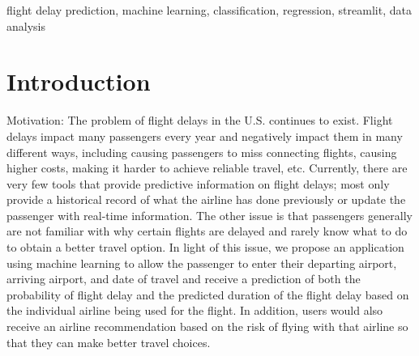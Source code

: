 
\begin{abstract}

Flight delays are a common issue that affect both airline operations and passengers. The purpose of this work is to investigate the delay of airline flights by analyzing historical airline flight data, using two types of machine learning techniques, classification (to predict if the flight will be delayed) and regression (to estimate the delay time). The training datasets used for both types of models are publicly accessible. Model comparison metrics used include accuracy, precision, recall, and mean square error.  

In addition to model performance being important, this work will demonstrate the practicality of these types of models by providing an interactive interface (with Streamlit) to allow users to enter their own flight information into the system to receive real-time predictions and visual insights. Multi-variable models are expected to outperform their simple baseline counterparts but will also produce a better balance between the two aspects: i.e., for automated predicting, and for providing a better understanding of how the model works. Overall, this work demonstrates a use of machine learning to solve real-world transportation problems, while still being user-friendly and easily accessible to all users.

\end{abstract}

\begin{IEEEkeywords}
flight delay prediction, machine learning, classification, regression, streamlit, data analysis
\end{IEEEkeywords}

\section{Introduction}

Motivation: 
The problem of flight delays in the U.S. continues to exist. Flight delays impact many passengers every year and negatively impact them in many different ways, including causing passengers to miss connecting flights, causing higher costs, making it harder to achieve reliable travel, etc. Currently, there are very few tools that provide predictive information on flight delays; most only provide a historical record of what the airline has done previously or update the passenger with real-time information. The other issue is that passengers generally are not familiar with why certain flights are delayed and rarely know what to do to obtain a better travel option. In light of this issue, we propose an application using machine learning to allow the passenger to enter their departing airport, arriving airport, and date of travel and receive a prediction of both the probability of flight delay and the predicted duration of the flight delay based on the individual airline being used for the flight. In addition, users would also receive an airline recommendation based on the risk of flying with that airline so that they can make better travel choices.

